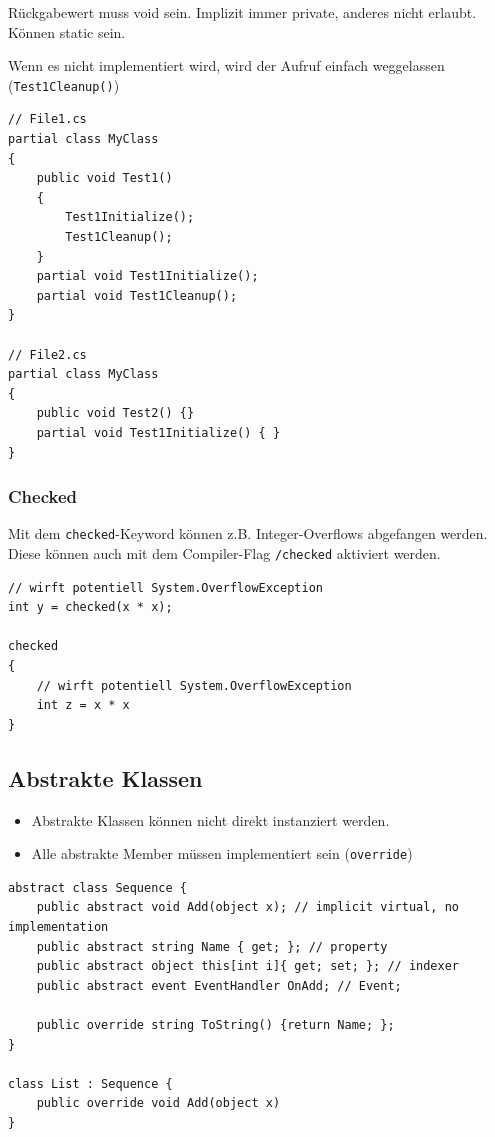 \documentclass[
a4paper,
oneside,
10pt,
fleqn,
headsepline,
toc=listofnumbered, 
bibliography=totocnumbered]{scrartcl}
\begin{document}
Rückgabewert muss void sein. Implizit immer private, anderes nicht erlaubt. Können static sein.

Wenn es nicht implementiert wird, wird der Aufruf einfach weggelassen (\lstinline|Test1Cleanup()|)

\begin{lstlisting}
// File1.cs
partial class MyClass
{
    public void Test1()
    {
        Test1Initialize();
        Test1Cleanup();
    }
    partial void Test1Initialize();
    partial void Test1Cleanup();
}

// File2.cs
partial class MyClass
{
    public void Test2() {}
    partial void Test1Initialize() { }
}
\end{lstlisting}

\subsubsection{Checked}
Mit dem \lstinline|checked|-Keyword können z.B. Integer-Overflows abgefangen werden. Diese können auch mit dem Compiler-Flag \lstinline|/checked| aktiviert werden.
\begin{lstlisting}
// wirft potentiell System.OverflowException
int y = checked(x * x);

checked
{
    // wirft potentiell System.OverflowException
    int z = x * x
}
\end{lstlisting}

\subsection{Abstrakte Klassen}
\begin{itemize}
	\item Abstrakte Klassen können nicht direkt instanziert werden. 
	\item Alle abstrakte Member müssen implementiert sein (\lstinline|override|)
\end{itemize}
\begin{lstlisting}
abstract class Sequence {
	public abstract void Add(object x); // implicit virtual, no implementation
	public abstract string Name { get; }; // property
	public abstract object this[int i]{ get; set; }; // indexer
	public abstract event EventHandler OnAdd; // Event;
	
	public override string ToString() {return Name; }; 
}

class List : Sequence {
	public override void Add(object x)
}
\end{lstlisting}
\end{document}
